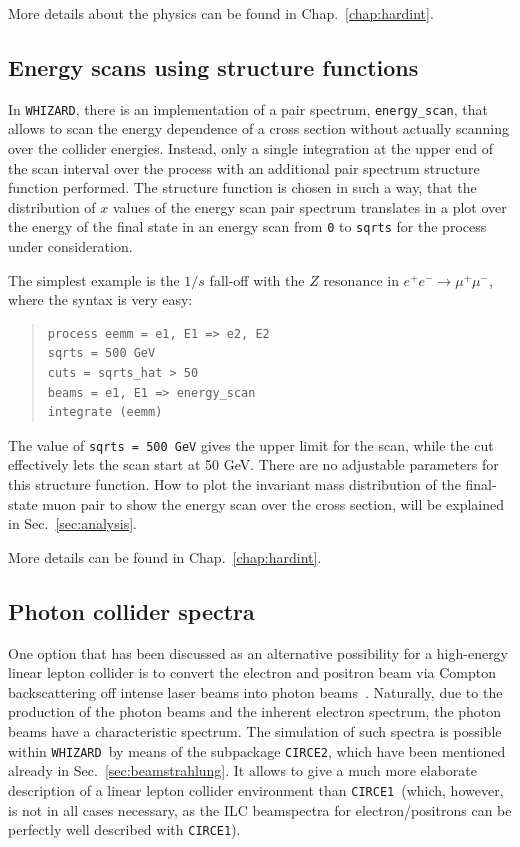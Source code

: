 \documentclass[12pt]{book}
\newcommand{\ttt}[1]{\texttt{#1}}
\newcommand{\whizard}{\ttt{WHIZARD}}
\newcommand{\circeone}{\ttt{CIRCE1}}
\newcommand{\circetwo}{\ttt{CIRCE2}}
\begin{document}
More details about the physics can be found in
Chap.~\ref{chap:hardint}.



\subsection{Energy scans using structure functions}

In \whizard, there is an implementation of a pair spectrum,
\ttt{energy\_scan}, that allows to scan the energy dependence of a
cross section without actually scanning over the collider
energies. Instead, only a single integration at the upper end of the
scan interval over the process with an additional pair spectrum
structure function performed. The structure function is chosen
in such a way, that the distribution of $x$ values of the energy scan
pair spectrum translates in a plot over the energy of the final state
in an energy scan from \ttt{0} to \ttt{sqrts} for the process under
consideration.

The simplest example is the $1/s$ fall-off with the $Z$ resonance in
$e^+e^- \to \mu^+ \mu^-$, where the syntax is very easy:
\begin{quote}
\begin{footnotesize}
\begin{Verbatim}
process eemm = e1, E1 => e2, E2
sqrts = 500 GeV
cuts = sqrts_hat > 50
beams = e1, E1 => energy_scan
integrate (eemm)
\end{Verbatim}
\end{footnotesize}
\end{quote}
The value of \ttt{sqrts = 500 GeV} gives the upper limit for the scan,
while the cut effectively lets the scan start at 50 GeV. There are no
adjustable parameters for this structure function. How to plot the
invariant mass distribution of the final-state muon pair to show the
energy scan over the cross section, will be explained in
Sec.~\ref{sec:analysis}.

More details can be found in Chap.~\ref{chap:hardint}.


\subsection{Photon collider spectra}
\label{sec:photoncoll}

One option that has been discussed as an alternative possibility for a
high-energy linear lepton collider is to convert the electron and
positron beam via Compton backscattering off intense laser beams into
photon
beams~\cite{Ginzburg:1981vm,Telnov:1989sd,Telnov:1995hc}. Naturally,
due to the production
of the photon beams and the inherent electron spectrum, the photon
beams have a characteristic spectrum. The simulation of such spectra
is possible within \whizard\ by means of the subpackage \circetwo,
which have been mentioned already in Sec.~\ref{sec:beamstrahlung}. It
allows to give a much more elaborate description of a linear lepton
collider environment than
\circeone\ (which, however, is not in all cases necessary, as the ILC
beamspectra for electron/positrons can be perfectly well described
with \circeone).
\end{document}
